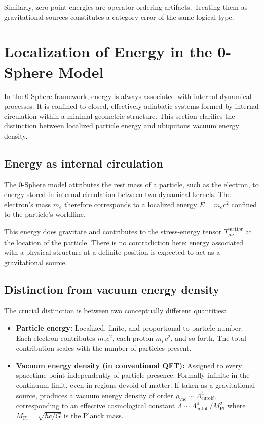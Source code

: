 \documentclass[12pt,letterpaper]{article}
\begin{document}
Similarly, zero-point energies are operator-ordering artifacts. Treating them as gravitational sources constitutes a category error of the same logical type.

\section{Localization of Energy in the 0-Sphere Model}

In the 0-Sphere framework, energy is always associated with internal dynamical processes. It is confined to closed, effectively adiabatic systems formed by internal circulation within a minimal geometric structure. This section clarifies the distinction between localized particle energy and ubiquitous vacuum energy density.

\subsection{Energy as internal circulation}

The 0-Sphere model attributes the rest mass of a particle, such as the electron, to energy stored in internal circulation between two dynamical kernels. The electron's mass $m_e$ therefore corresponds to a localized energy $E = m_e c^2$ confined to the particle's worldline.

This energy does gravitate and contributes to the stress-energy tensor $T_{\mu\nu}^{\mathrm{matter}}$ at the location of the particle. There is no contradiction here: energy associated with a physical structure at a definite position is expected to act as a gravitational source.

\subsection{Distinction from vacuum energy density}

The crucial distinction is between two conceptually different quantities:

\begin{itemize}
\item \textbf{Particle energy:} Localized, finite, and proportional to particle number. Each electron contributes $m_e c^2$, each proton $m_p c^2$, and so forth. The total contribution scales with the number of particles present.

\item \textbf{Vacuum energy density (in conventional QFT):} Assigned to every spacetime point independently of particle presence. Formally infinite in the continuum limit, even in regions devoid of matter. If taken as a gravitational source, produces a vacuum energy density of order $\rho_{\mathrm{vac}} \sim \Lambda_{\mathrm{cutoff}}^4$, corresponding to an effective cosmological constant $\Lambda \sim \Lambda_{\mathrm{cutoff}}^4/M_{\mathrm{Pl}}^2$ where $M_{\mathrm{Pl}} = \sqrt{\hbar c/G}$ is the Planck mass.
\end{itemize}
\end{document}

